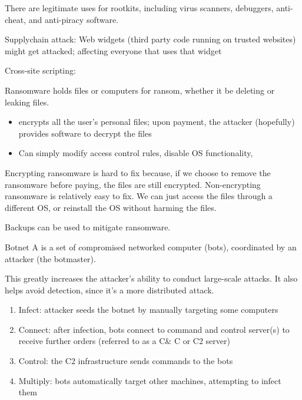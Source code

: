 \documentclass[code]{amznotes}
\begin{document}
There are legitimate uses for rootkits, including virus scanners, debuggers, anti-cheat, and anti-piracy software.


Supplychain attack: Web widgets (third party code running on trusted websites) might get attacked; affecting everyone that uses that widget

Cross-site scripting: 

\begin{dfnbox}{Ransomware}{}
     holds files or computers for ransom, whether it be deleting or leaking files.
\end{dfnbox}

\begin{itemize}
    \item {} encrypts all the user's personal files; upon payment, the attacker (hopefully) provides software to decrypt the files
    \item {} Can simply modify access control rules, disable OS functionality,
\end{itemize}

Encrypting ransomware is hard to fix because, if we choose to remove the ransomware before paying, the files are still encrypted. Non-encrypting ransomware is relatively easy to fix. We can just access the files through a different OS, or reinstall the OS without harming the files.

Backups can be used to mitigate ransomware.

\begin{dfnbox}{Botnet}{}
    A  is a set of compromised networked computer (bots), coordinated by an attacker (the botmaster).
\end{dfnbox}

This greatly increases the attacker's ability to conduct large-scale attacks. It also helps avoid detection, since it's a more distributed attack.

\begin{enumerate}
    \item Infect: attacker seeds the botnet by manually targeting some computers
    \item Connect: after infection, bots connect to command and control server(s) to receive further orders (referred to as a C\& C or C2 server)
    \item Control: the C2 infrastructure sends commands to the bots
    \item Multiply: bots automatically target other machines, attempting to infect them
\end{enumerate}
\end{document}
